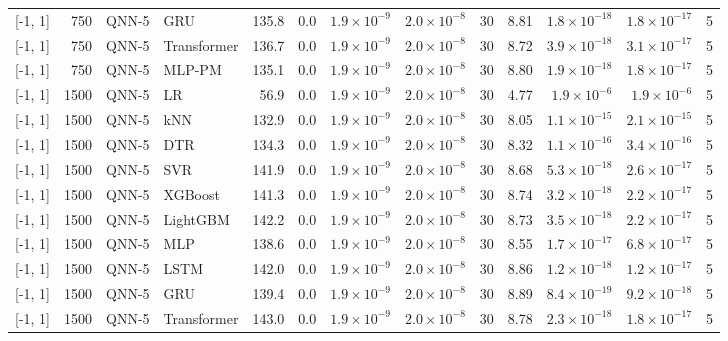 \begin{longtable}{lrllrrrrrrrrr}
{[-1, 1]} & 750 & QNN-5 & GRU & 135.8 & 0.0 & $1.9 \times 10^{-9}$ & $2.0 \times 10^{-8}$ & 30 & 8.81 & $1.8 \times 10^{-18}$ & $1.8 \times 10^{-17}$ & 5 \\
{[-1, 1]} & 750 & QNN-5 & Transformer & 136.7 & 0.0 & $1.9 \times 10^{-9}$ & $2.0 \times 10^{-8}$ & 30 & 8.72 & $3.9 \times 10^{-18}$ & $3.1 \times 10^{-17}$ & 5 \\
{[-1, 1]} & 750 & QNN-5 & MLP-PM & 135.1 & 0.0 & $1.9 \times 10^{-9}$ & $2.0 \times 10^{-8}$ & 30 & 8.80 & $1.9 \times 10^{-18}$ & $1.8 \times 10^{-17}$ & 5 \\
\midrule
{[-1, 1]} & 1500 & QNN-5 & LR & 56.9 & 0.0 & $1.9 \times 10^{-9}$ & $2.0 \times 10^{-8}$ & 30 & 4.77 & $1.9 \times 10^{-6}$ & $1.9 \times 10^{-6}$ & 5 \\
{[-1, 1]} & 1500 & QNN-5 & kNN & 132.9 & 0.0 & $1.9 \times 10^{-9}$ & $2.0 \times 10^{-8}$ & 30 & 8.05 & $1.1 \times 10^{-15}$ & $2.1 \times 10^{-15}$ & 5 \\
{[-1, 1]} & 1500 & QNN-5 & DTR & 134.3 & 0.0 & $1.9 \times 10^{-9}$ & $2.0 \times 10^{-8}$ & 30 & 8.32 & $1.1 \times 10^{-16}$ & $3.4 \times 10^{-16}$ & 5 \\
{[-1, 1]} & 1500 & QNN-5 & SVR & 141.9 & 0.0 & $1.9 \times 10^{-9}$ & $2.0 \times 10^{-8}$ & 30 & 8.68 & $5.3 \times 10^{-18}$ & $2.6 \times 10^{-17}$ & 5 \\
{[-1, 1]} & 1500 & QNN-5 & XGBoost & 141.3 & 0.0 & $1.9 \times 10^{-9}$ & $2.0 \times 10^{-8}$ & 30 & 8.74 & $3.2 \times 10^{-18}$ & $2.2 \times 10^{-17}$ & 5 \\
{[-1, 1]} & 1500 & QNN-5 & LightGBM & 142.2 & 0.0 & $1.9 \times 10^{-9}$ & $2.0 \times 10^{-8}$ & 30 & 8.73 & $3.5 \times 10^{-18}$ & $2.2 \times 10^{-17}$ & 5 \\
{[-1, 1]} & 1500 & QNN-5 & MLP & 138.6 & 0.0 & $1.9 \times 10^{-9}$ & $2.0 \times 10^{-8}$ & 30 & 8.55 & $1.7 \times 10^{-17}$ & $6.8 \times 10^{-17}$ & 5 \\
{[-1, 1]} & 1500 & QNN-5 & LSTM & 142.0 & 0.0 & $1.9 \times 10^{-9}$ & $2.0 \times 10^{-8}$ & 30 & 8.86 & $1.2 \times 10^{-18}$ & $1.2 \times 10^{-17}$ & 5 \\
{[-1, 1]} & 1500 & QNN-5 & GRU & 139.4 & 0.0 & $1.9 \times 10^{-9}$ & $2.0 \times 10^{-8}$ & 30 & 8.89 & $8.4 \times 10^{-19}$ & $9.2 \times 10^{-18}$ & 5 \\
{[-1, 1]} & 1500 & QNN-5 & Transformer & 143.0 & 0.0 & $1.9 \times 10^{-9}$ & $2.0 \times 10^{-8}$ & 30 & 8.78 & $2.3 \times 10^{-18}$ & $1.8 \times 10^{-17}$ & 5 \\

\end{longtable}

